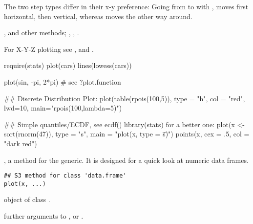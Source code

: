 %
\begin{Details}\relax
The two step types differ in their x-y preference: Going from
 to  with , 
moves first horizontal, then vertical, whereas  moves
the other way around.
\end{Details}
%
\begin{SeeAlso}\relax
{},  and other
methods; , , .

For X-Y-Z plotting see ,  and
.
\end{SeeAlso}
%
\begin{Examples}
\begin{ExampleCode}
require(stats)
plot(cars)
lines(lowess(cars))

plot(sin, -pi, 2*pi) # see ?plot.function

## Discrete Distribution Plot:
plot(table(rpois(100,5)), type = "h", col = "red", lwd=10,
     main="rpois(100,lambda=5)")

## Simple quantiles/ECDF, see ecdf() {library(stats)} for a better one:
plot(x <- sort(rnorm(47)), type = "s", main = "plot(x, type = \"s\")")
points(x, cex = .5, col = "dark red")
\end{ExampleCode}
\end{Examples}
%
\begin{Description}\relax
{}, a method for the  generic.
It is designed for a quick look at numeric data frames.
\end{Description}
%
\begin{Usage}
\begin{verbatim}
## S3 method for class 'data.frame'
plot(x, ...)
\end{verbatim}
\end{Usage}
%
\begin{Arguments}
\begin{ldescription}
\item[\code{x}] object of class .
\item[\code{...}] further arguments to ,
 or .
\end{ldescription}
\end{Arguments}
